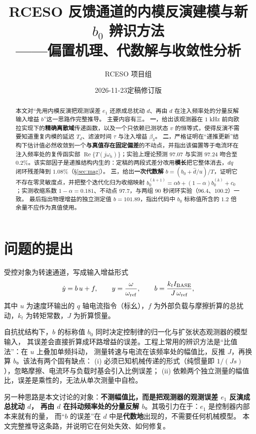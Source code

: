 \documentclass[11pt,a4paper]{ctexart}
\title{\bfseries RCESO 反馈通道的内模反演建模与新 $b_0$ 辨识方法\\[2mm]
\large ——偏置机理、代数解与收敛性分析}
\author{RCESO 项目组}
\date{2026-11-23\quad 定稿修订版}
\newcommand{\RE}{\operatorname{Re}}
\begin{document}
\maketitle

\begin{abstract}
\noindent
本文对“先用内模反演把观测误差 $e_1$ 还原成总扰动 $d$、再由 $d$ 在注入频率处的分量反解输入增益 $b$”这一思路作完整推导。
主要内容有三。
\textbf{一}，给出该观测器在 $1$ kHz 前向欧拉实现下的\textbf{精确离散域}传递函数，以及一个只依赖已测状态 $v$ 的恒等式，使得反演不需要知道重复内模的延迟 $T_d$、滤波时间 $\tau$ 与注入增益 $\beta_3$。
\textbf{二}，严格证明在“递推更新”结构下估计值必然收敛到一个\textbf{与真值存在固定偏差}的不动点，并指出该偏置等于电流环在注入频率处的复传函实部 $\RE\{T(j\omega_h)\}$；实验上理论预测 $97.07$ 与实测 $97.24$ 吻合至 $0.2\%$。该实部因子是递推结构内生的：定稿的两段式差分改用\textbf{模长}把它整体消去，$dq$ 闭环残差降到 $1.08\%$（\S\ref{sec:mag}）。
\textbf{三}，给出\textbf{一次代数解} $b=(b_0+\hat d/u)/T$，证明它不存在零灵敏度点，并把整个迭代化归为收缩映射 $b_0^{(k+1)}=\alpha b+(1-\alpha)b_0^{(k)}+c_0$；实测收缩系数 $1-\alpha=0.181$、不动点 $97.7$，与两组 $90$ 秒闭环实验（$96.4$、$100.2$）一致。
最后指出物理增益的独立测定值 $b=101.89$，指出代码中 $b_0$ 标称值所含的 $1.2$ 倍余量不应作为真值使用。
\end{abstract}

\tableofcontents
\newpage

\section{问题的提出}

受控对象为转速通道，写成输入增益形式
\begin{equation}
\dot y=b\,u+f,\qquad y=\frac{\omega}{\omega_{\rm ref}},\qquad
b=\frac{k_t I_{\rm BASE}}{J\,\omega_{\rm ref}},
\label{eq:plant}
\end{equation}
其中 $u$ 为速度环输出的 $q$ 轴电流指令（标幺），$f$ 为外部负载与摩擦折算的总扰动，$k_t$ 为转矩常数，$J$ 为折算惯量。

自抗扰结构下，$b$ 的标称值 $b_0$ 同时决定控制律的归一化与扩张状态观测器的模型输入，
其误差会直接折算成环路增益的误差。工程上常用的辨识方法是“比值法”：在 $u$ 上叠加单频抖动，
测量转速与电流在该频率处的幅值比，反推 $J$，再换算 $b$。该法有两个固有缺点：
(i) 必须已知机械传递的形式（纯惯量即 $1/(Js)$），忽略摩擦、电流环与负载时基会引入比例误差；
(ii) 依赖两个独立测量的幅值比，误差是乘性的，无法从单次测量中自检。

另一种思路是本文讨论的对象：\textbf{不测幅值比，而是把观测器的观测误差 $e_1$ 反演成总扰动 $d$，
再由 $d$ 在抖动频率处的分量反解 $b$}。其吸引力在于：$e_1$ 是控制器内部本来就有的量，
而“$b$ 的误差”在 $d$ 中是\textbf{代数地}出现的，不需要任何机械模型。
本文完整推导这条路，并说明它在何处失效、如何修复。
\end{document}
